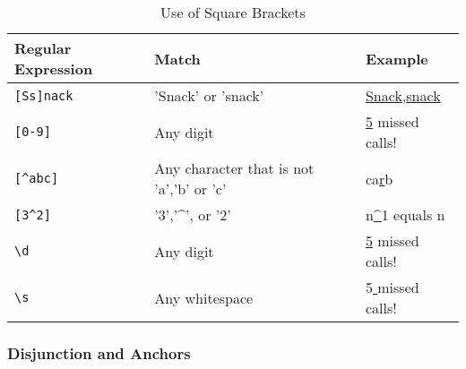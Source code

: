 \begin{table}[htbp]
  \caption[Regular Expression Square Brackets]{Use of Square Brackets}\label{tab:re_sb}		
  \centering
  \begin{tabular}{l l l}
    Regular Expression&Match&Example\\ \toprule
    \texttt{[Ss]nack}&'Snack' or 'snack'&\underline{Snack},\underline{snack}\\ \hline
    \texttt{[0-9]}&Any digit&\underline{5} missed calls!\\ \hline
    \texttt{[\^{}abc]}&Any character that is not 'a','b' or 'c'&ca\underline{r}b\\ \hline
    \texttt{[3\^{}2]}&'3','\^{}', or '2'&n\underline{\^{}}1 equals n\\ \hline
    \texttt{\textbackslash d}&Any digit&\underline{5} missed calls!\\ \hline
    \texttt{\textbackslash s}&Any whitespace&5\underline{ }missed\underline{ }calls!\\ \hline
  \end{tabular}
\end{table}

\subsubsection{Disjunction and Anchors}

